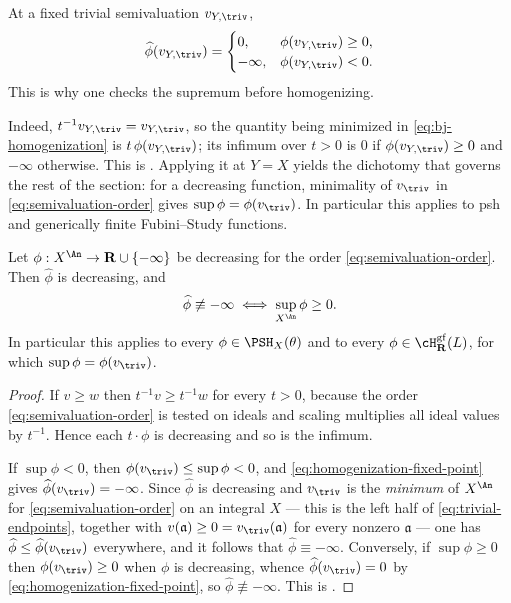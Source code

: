 At a fixed trivial semivaluation $v_{Y,\triv}$,
\begin{equation}
\label{eq:homogenization-fixed-point}
 \widehat\phi(v_{Y,\triv})=
 \begin{cases}
 0,&\phi(v_{Y,\triv})\geq0,\\
 -\infty,&\phi(v_{Y,\triv})<0.
 \end{cases}
\end{equation}
This is why one checks the supremum before homogenizing.

Indeed, $t^{-1}v_{Y,\triv}=v_{Y,\triv}$, so the quantity being minimized
in \eqref{eq:bj-homogenization} is $t\,\phi(v_{Y,\triv})$; its infimum
over $t>0$ is $0$ if $\phi(v_{Y,\triv})\geq0$ and $-\infty$
otherwise.  This is \cite[Example~6.12]{BJ22}.  Applying it at
$Y=X$ yields the dichotomy that governs the rest of the section: for a
decreasing function, minimality of $v_{\triv}$ in
\eqref{eq:semivaluation-order} gives
$\sup\phi=\phi(v_{\triv})$.  In particular this applies to psh and
generically finite Fubini--Study functions.

\begin{corollary}
\label{cor:ch35-homogenization-alternative}
Let $\phi:X^{\An}\to\mathbf R\cup\{-\infty\}$ be decreasing for the order
\eqref{eq:semivaluation-order}.  Then $\widehat\phi$ is decreasing, and
\[
 \widehat\phi\not\equiv-\infty
 \iff\sup_{X^{\An}}\phi\geq0 .
\]
In particular this applies to every $\phi\in\PSH_X(\theta)$ and to every
$\phi\in\cH^{\mathrm{gf}}_{\mathbf R}(L)$, for which
$\sup\phi=\phi(v_{\triv})$.
\end{corollary}

\begin{proof}
If $v\geq w$ then $t^{-1}v\geq t^{-1}w$ for every $t>0$, because the
order \eqref{eq:semivaluation-order} is tested on ideals and scaling
multiplies all ideal values by $t^{-1}$.  Hence each $t\cdot\phi$ is
decreasing and so is the infimum.

If $\sup\phi<0$, then $\phi(v_{\triv})\leq\sup\phi<0$, and
\eqref{eq:homogenization-fixed-point} gives
$\widehat\phi(v_{\triv})=-\infty$.  Since $\widehat\phi$ is decreasing
and $v_{\triv}$ is the \emph{minimum} of $X^{\An}$ for
\eqref{eq:semivaluation-order} on an integral $X$ --- this is the left
half of \eqref{eq:trivial-endpoints}, together with $v(\mathfrak a)\geq0
=v_{\triv}(\mathfrak a)$ for every nonzero $\mathfrak a$ --- one has
$\widehat\phi\leq\widehat\phi(v_{\triv})$ everywhere, and it follows that
$\widehat\phi\equiv-\infty$.  Conversely, if $\sup\phi\geq0$ then
$\phi(v_{\triv})\geq0$ when $\phi$ is decreasing, whence
$\widehat\phi(v_{\triv})=0$ by
\eqref{eq:homogenization-fixed-point}, so $\widehat\phi\not\equiv-\infty$.
This is \cite[Lemma~6.14]{BJ22}.
\end{proof}

